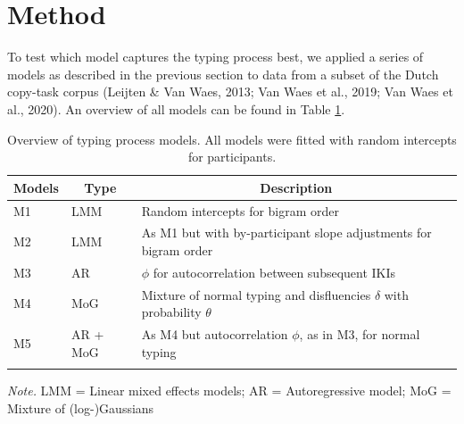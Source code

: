 \documentclass[english,man,floatsintext]{apa7}
\begin{document}
\hypertarget{method}{%
\section{Method}\label{method}}

To test which model captures the typing process best, we applied a series of models as described in the previous section to data from a subset of the Dutch copy-task corpus (Leijten \& Van Waes, 2013; Van Waes et al., 2019; Van Waes et al., 2020). An overview of all models can be found in Table \ref{tab:models}.

\begin{table}[!ht]

\begin{center}
\begin{threeparttable}

\caption{\label{tab:models}Overview of typing process models. All models were fitted with random intercepts for participants.}

\begin{tabular}{lll}
\toprule
Models & \multicolumn{1}{c}{Type} & \multicolumn{1}{c}{Description}\\
\midrule
M1 & LMM & Random intercepts for bigram order\\
M2 & LMM & As M1 but with by-participant slope adjustments for bigram order\\
M3 & AR & $\phi$ for autocorrelation between subsequent IKIs\\
M4 & MoG & Mixture of normal typing and disfluencies $\delta$ with probability $\theta$\\
M5 & AR + MoG & As M4 but autocorrelation $\phi$, as in M3, for normal typing\\
\bottomrule
\addlinespace
\end{tabular}

\begin{tablenotes}[para]
\normalsize{\textit{Note.} LMM = Linear mixed effects models; AR = Autoregressive model; MoG = Mixture of (log-)Gaussians}
\end{tablenotes}

\end{threeparttable}
\end{center}

\end{table}
\end{document}
